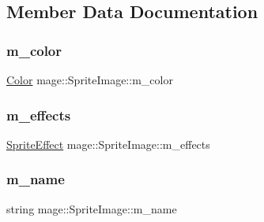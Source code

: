 \subsection{Member Data Documentation}
\hypertarget{classmage_1_1_sprite_image_a63331a3170f5af1a14b15913afc59ce2}{}\label{classmage_1_1_sprite_image_a63331a3170f5af1a14b15913afc59ce2} 
\subsubsection{\texorpdfstring{m\+\_\+color}{m\_color}}
{\footnotesize\ttfamily \hyperlink{structmage_1_1_color}{Color} mage\+::\+Sprite\+Image\+::m\+\_\+color\hspace{0.3cm}{\ttfamily [private]}}

\hypertarget{classmage_1_1_sprite_image_a4233e0143d4dd0b609e38f5cbd3aef98}{}\label{classmage_1_1_sprite_image_a4233e0143d4dd0b609e38f5cbd3aef98} 
\subsubsection{\texorpdfstring{m\+\_\+effects}{m\_effects}}
{\footnotesize\ttfamily \hyperlink{namespacemage_a9cfe18123066ba4236f548f9de75d881}{Sprite\+Effect} mage\+::\+Sprite\+Image\+::m\+\_\+effects\hspace{0.3cm}{\ttfamily [private]}}

\hypertarget{classmage_1_1_sprite_image_af172c204ee34926cc1dbead8351de817}{}\label{classmage_1_1_sprite_image_af172c204ee34926cc1dbead8351de817} 
\subsubsection{\texorpdfstring{m\+\_\+name}{m\_name}}
{\footnotesize\ttfamily string mage\+::\+Sprite\+Image\+::m\+\_\+name\hspace{0.3cm}{\ttfamily [private]}}

\hypertarget{classmage_1_1_sprite_image_a936aed1b97b91378724702c33eaf30be}{}\label{classmage_1_1_sprite_image_a936aed1b97b91378724702c33eaf30be} 
